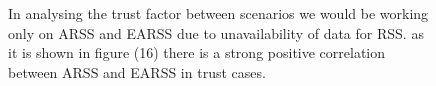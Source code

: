 \documentclass[letterpaper, 10 pt, conference]{ieeeconf}
\begin{document}
\begin{figure}[h!]
In analysing the trust factor between scenarios we would be working only on ARSS and EARSS due to unavailability of data for RSS. as it is shown in figure (16) there is a strong positive correlation between ARSS and EARSS in trust cases.
\end{figure}

\begin{figure}[h!]
\captionsetup[subfigure]{labelformat=empty}
\hfill
{}\hfill
{}\hfill
\end{figure}
\end{document}
